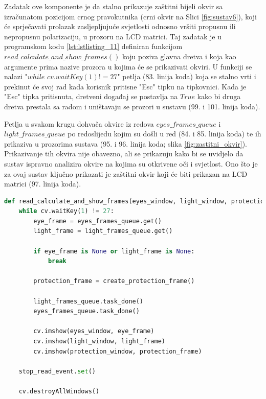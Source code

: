 \documentclass{foi}
\begin{document}
Zadatak ove komponente je da stalno prikazuje zaštitni bijeli okvir sa izračunatom pozicijom crnog pravokutnika (crni okvir na Slici \ref{fig:sustav6}), koji će sprječavati prolazak zasljepljujuće svjetlosti odnosno vršiti propusnu ili nepropusnu polarizaciju, u prozoru na LCD matrici. Taj zadatak je u programskom kodu \ref{lst:lstlisting_11} definiran funkcijom $read\_calculate\_and\_show\_frames()$ koju poziva glavna dretva i koja kao argumente prima nazive prozora u kojima će se prikazivati okviri. U funkciji se nalazi "$while$ $cv.waitKey(1) != 27$" petlja (83. linija koda) koja se stalno vrti i prekinut će svoj rad kada korisnik pritisne "Esc" tipku na tipkovnici. Kada je "Esc" tipka pritisnuta, dretveni događaj se postavlja na $True$ kako bi druga dretva prestala sa radom i uništavaju se prozori u sustavu (99. i 101. linija koda).

Petlja u svakom krugu dohvača okvire iz redova $eyes\_frames\_queue$ i $light\_frames\_queue$ po redoslijedu kojim su došli u red (84. i 85. linija koda) te ih prikaziva u prozorima sustava (95. i 96. linija koda; slika \ref{fig:zastitni_okvir}). Prikazivanje tih okvira nije obavezno, ali se prikazuju kako bi se uvidjelo da sustav ispravno analizira okvire na kojima su otkrivene oči i svjetlost. Ono što je za ovaj sustav ključno prikazati je zaštitni okvir koji će biti prikazan na LCD matrici (97. linija koda).

\begin{lstlisting}[language=Python, label={lst:lstlisting_11}, firstnumber=82, style=colored, caption={Definicija funkcije $read\_calculate\_and\_show\_frames()$}]
def read_calculate_and_show_frames(eyes_window, light_window, protection_window):
    while cv.waitKey(1) != 27:
        eye_frame = eyes_frames_queue.get()
        light_frame = light_frames_queue.get()

        if eye_frame is None or light_frame is None:
            break

        protection_frame = create_protection_frame()

        light_frames_queue.task_done()
        eyes_frames_queue.task_done()

        cv.imshow(eyes_window, eye_frame)
        cv.imshow(light_window, light_frame)
        cv.imshow(protection_window, protection_frame)

    stop_read_event.set()

    cv.destroyAllWindows()
\end{lstlisting}
\end{document}
